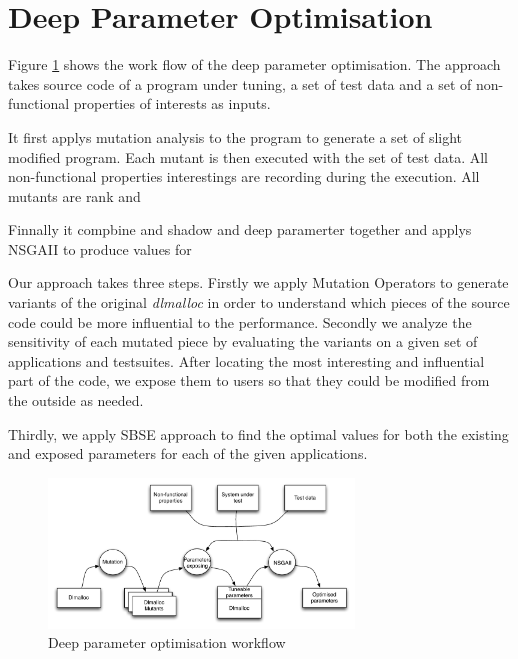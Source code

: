 \section{Deep Parameter Optimisation}

Figure \ref{system} shows the work flow of the deep parameter optimisation. The approach takes source code of a program under tuning, a set of test data and a set of non-functional properties of interests as inputs. 


It first applys mutation analysis to the program to generate a set of slight modified program. Each mutant is then executed with the set of test data.  All non-functional properties interestings are recording during the execution. All mutants are rank and 

Finnally it compbine and shadow and deep paramerter together and applys NSGAII to produce values for



Our approach takes three steps. Firstly we apply Mutation Operators to generate variants of the original \emph{dlmalloc} in order to understand which pieces of the source code could be more influential to the performance. Secondly we analyze the sensitivity of each mutated piece by evaluating the variants on a given set of applications and testsuites. After locating the most interesting and influential part of the code, we expose them to users so that they could be modified from the outside as needed. 

Thirdly, we apply SBSE approach to find the optimal values for both the existing and exposed parameters for each of the given applications.

\begin{figure}[htbp]
\centering
\includegraphics[width=3.2in]{pics/system}
\caption{Deep parameter optimisation workflow}\label{system}
\end{figure}




